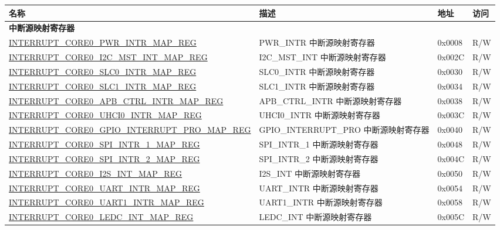 \begin{longtable}{ | p{10cm} | m{10cm} | m{1.3cm} | m{1.0cm} | }
\hline\rowcolor{lightgray}
名称 & 描述 & 地址 & 访问 \\ \hline
\endhead
\multicolumn{4}{|l|}{\textbf{中断源映射寄存器}} \\ \hline
\hyperref[regdesc:INTERRUPTCORE0PWRINTRMAPREG]{INTERRUPT\_CORE0\_PWR\_INTR\_MAP\_REG} & PWR\_INTR 中断源映射寄存器 & 0x0008 & R/W \\ \hline
\hyperref[regdesc:INTERRUPTCORE0I2CMSTINTMAPREG]{INTERRUPT\_CORE0\_I2C\_MST\_INT\_MAP\_REG} & I2C\_MST\_INT 中断源映射寄存器 & 0x002C & R/W \\ \hline
\hyperref[regdesc:INTERRUPTCORE0SLC0INTRMAPREG]{INTERRUPT\_CORE0\_SLC0\_INTR\_MAP\_REG} & SLC0\_INTR 中断源映射寄存器 & 0x0030 & R/W \\ \hline
\hyperref[regdesc:INTERRUPTCORE0SLC1INTRMAPREG]{INTERRUPT\_CORE0\_SLC1\_INTR\_MAP\_REG} & SLC1\_INTR 中断源映射寄存器 & 0x0034 & R/W \\ \hline
\hyperref[regdesc:INTERRUPTCORE0APBCTRLINTRMAPREG]{INTERRUPT\_CORE0\_APB\_CTRL\_INTR\_MAP\_REG} & APB\_CTRL\_INTR 中断源映射寄存器 & 0x0038 & R/W \\ \hline
\hyperref[regdesc:INTERRUPTCORE0UHCI0INTRMAPREG]{INTERRUPT\_CORE0\_UHCI0\_INTR\_MAP\_REG} & UHCI0\_INTR 中断源映射寄存器 & 0x003C & R/W \\ \hline
\hyperref[regdesc:INTERRUPTCORE0GPIOINTERRUPTPROMAPREG]{INTERRUPT\_CORE0\_GPIO\_INTERRUPT\_PRO\_MAP\_REG} & GPIO\_INTERRUPT\_PRO 中断源映射寄存器 & 0x0040 & R/W \\ \hline
\hyperref[regdesc:INTERRUPTCORE0SPIINTR1MAPREG]{INTERRUPT\_CORE0\_SPI\_INTR\_1\_MAP\_REG} & SPI\_INTR\_1 中断源映射寄存器 & 0x0048 & R/W \\ \hline
\hyperref[regdesc:INTERRUPTCORE0SPIINTR2MAPREG]{INTERRUPT\_CORE0\_SPI\_INTR\_2\_MAP\_REG} & SPI\_INTR\_2 中断源映射寄存器 & 0x004C & R/W \\ \hline
\hyperref[regdesc:INTERRUPTCORE0I2S1INTMAPREG]{INTERRUPT\_CORE0\_I2S\_INT\_MAP\_REG} & I2S\_INT 中断源映射寄存器 & 0x0050 & R/W \\ \hline
\hyperref[regdesc:INTERRUPTCORE0UARTINTRMAPREG]{INTERRUPT\_CORE0\_UART\_INTR\_MAP\_REG} & UART\_INTR 中断源映射寄存器 & 0x0054 & R/W \\ \hline
\hyperref[regdesc:INTERRUPTCORE0UART1INTRMAPREG]{INTERRUPT\_CORE0\_UART1\_INTR\_MAP\_REG} & UART1\_INTR 中断源映射寄存器 & 0x0058 & R/W \\ \hline
\hyperref[regdesc:INTERRUPTCORE0LEDCINTMAPREG]{INTERRUPT\_CORE0\_LEDC\_INT\_MAP\_REG} & LEDC\_INT 中断源映射寄存器 & 0x005C & R/W \\ \hline

\end{longtable}
